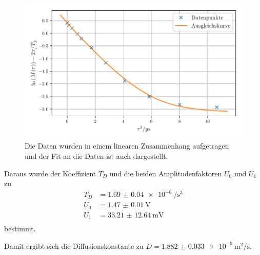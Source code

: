 \begin{figure}
    \centering
    \includegraphics[width=\textwidth]{plots/echo.pdf}
    \caption{Die Daten wurden in einem linearen Zusammenhang aufgetragen und der Fit an die Daten ist auch dargestellt.}
    \label{abb:echo}
\end{figure}

Daraus wurde der Koeffizient $T_D$ und die beiden Amplitudenfaktoren $U_0$ und $U_1$ zu 
\begin{align*}
T_D &= \SI{1.69(4)e-6}{\per\second\tothe{3}} \\
U_0 &= \SI{1.47(1)}{\volt} \\
U_1 &= \SI{33.21(1264)}{\milli\volt} \\
\end{align*}
bestimmt.

Damit ergibt sich die Diffusionskonstante zu $D = \SI{1.882(33)e-9}{\meter\squared\per\second}$.
